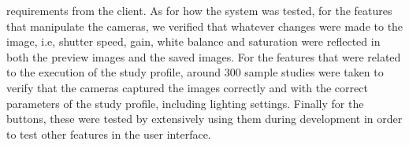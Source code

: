 requirements from the client. As for how the system was tested, for the features that manipulate the cameras, we verified that whatever changes were made to the image, i.e, shutter speed, gain, white balance and saturation were reflected in both the preview images and the saved images. For the features that were related to the execution of the study profile, around 300 sample studies were taken to verify that the cameras captured the images correctly and with the correct parameters of the study profile, including lighting settings. Finally for the buttons, these were tested by extensively using them during development in order to test other features in the user interface.
